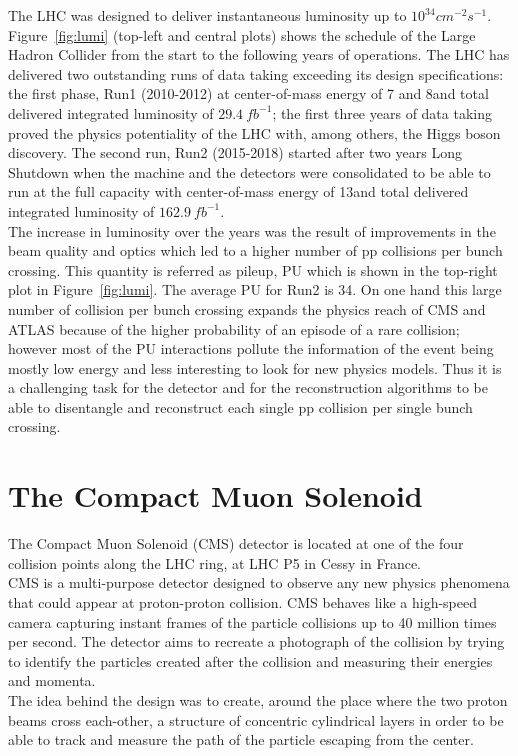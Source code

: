 The LHC was designed to deliver instantaneous luminosity up to $10^{34}cm^{-2}s^{-1}$.\\
Figure~\ref{fig:lumi} (top-left and central
plots) shows the schedule of the Large Hadron Collider from the start
to the following years of operations. The LHC has delivered two
outstanding runs of data taking exceeding its design specifications: the first phase, Run1 (2010-2012) at
center-of-mass energy of 7 and 8\TeV and total delivered integrated
luminosity of $29.4\ fb^{-1}$; the first three years of data taking proved
the physics potentiality of the LHC with, among others, the Higgs boson
discovery. The second run, Run2 (2015-2018) started after two years Long
Shutdown when the machine and the detectors were 
consolidated to be able to run at the full capacity with 
center-of-mass energy of 13\TeV and total delivered integrated
luminosity of $162.9\ fb^{-1}$.\\
The increase in luminosity over the
years was the result of improvements in the beam quality and optics which
led to a higher number of pp collisions per bunch crossing. This
quantity is referred as pileup, PU which is shown in the top-right plot
in Figure~\ref{fig:lumi}. The average \textlangle{}PU\textrangle{} for
Run2 is 34. On one hand this large
number of collision per bunch crossing 
expands the physics reach of CMS and ATLAS because of
the higher probability of an episode of a rare collision; however
most of the PU interactions pollute the information of the
event being mostly low energy and less interesting to look for
new physics models. Thus it is a challenging task for the detector and for
the reconstruction algorithms to be able 
to disentangle and reconstruct each single pp collision per single
bunch crossing.

\section{The Compact Muon Solenoid}\label{cms}

The Compact Muon Solenoid (CMS) detector is located at one of the four
collision points along the LHC ring, at LHC P5 in Cessy in
France.  \\
CMS is a multi-purpose detector designed to observe any new physics
phenomena that could appear at proton-proton collision. CMS behaves
like a high-speed camera capturing instant frames of the particle
collisions up to 40 million times per second. The detector aims to recreate a
photograph of the collision by trying to
identify the particles created after the collision and
measuring their energies and momenta. \\
The idea behind the design was to create, around the place where the
two proton beams cross each-other, a structure of concentric cylindrical layers
in order to be able to track and measure the path of the particle
escaping from the center.   

